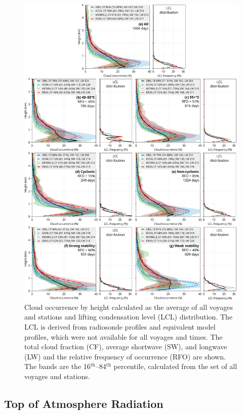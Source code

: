 \documentclass[draft]{agujournal2019}
\begin{document}
\begin{figure}[p!]
\centering
\includegraphics[width=\textwidth]{img/cl_agg.pdf}
\caption{
Cloud occurrence by height calculated as the average of all voyages and stations and lifting condensation level (LCL) distribution. The LCL is derived from radiosonde profiles and equivalent model profiles, which were not available for all voyages and times. The total cloud fraction (CF), average shortwave (SW), and longwave (LW) and the relative frequency of occurrence (RFO) are shown. The bands are the 16$^\mathrm{th}$--84$^\mathrm{th}$ percentile, calculated from the set of all voyages and stations.
}
\label{fig:cloud-occurrence}
\end{figure}

\subsection{Top of Atmosphere Radiation}
\end{document}
